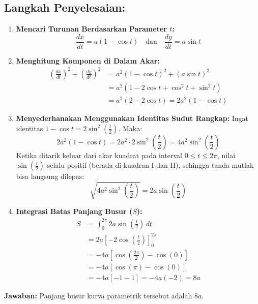 \documentclass[11pt,a4paper]{article}
\begin{document}
\subsection*{Langkah Penyelesaian:}
\begin{enumerate}
  \item \textbf{Mencari Turunan Berdasarkan Parameter $t$:}
  \begin{equation*}
    \frac{dx}{dt} = a(1 - \cos t) \quad \text{dan} \quad \frac{dy}{dt} = a\sin t
  \end{equation*}
  
  \item \textbf{Menghitung Komponen di Dalam Akar:}
  \begin{align*}
    \left(\frac{dx}{dt}\right)^2 + \left(\frac{dy}{dt}\right)^2 &= a^2(1 - \cos t)^2 + (a\sin t)^2 \\
    &= a^2(1 - 2\cos t + \cos^2 t + \sin^2 t) \\
    &= a^2(2 - 2\cos t) = 2a^2(1 - \cos t)
  \end{align*}
  
  \item \textbf{Menyederhanakan Menggunakan Identitas Sudut Rangkap:}
  Ingat identitas $1 - \cos t = 2\sin^2\left(\frac{t}{2}\right)$. Maka:
  \begin{equation*}
    2a^2(1 - \cos t) = 2a^2 \cdot 2\sin^2\left(\frac{t}{2}\right) = 4a^2\sin^2\left(\frac{t}{2}\right)
  \end{equation*}
  Ketika ditarik keluar dari akar kuadrat pada interval $0 \leq t \leq 2\pi$, nilai $\sin\left(\frac{t}{2}\right)$ selalu positif (berada di kuadran I dan II), sehingga tanda mutlak bisa langsung dilepas:
  \begin{equation*}
    \sqrt{4a^2\sin^2\left(\frac{t}{2}\right)} = 2a\sin\left(\frac{t}{2}\right)
  \end{equation*}
  
  \item \textbf{Integrasi Batas Panjang Busur ($S$):}
  \begin{align*}
    S &= \int_{0}^{2\pi} 2a\sin\left(\frac{t}{2}\right) \, dt \\
    &= 2a \left[ -2\cos\left(\frac{t}{2}\right) \right]_{0}^{2\pi} \\
    &= -4a \left[ \cos\left(\frac{2\pi}{2}\right) - \cos(0) \right] \\
    &= -4a [ \cos(\pi) - \cos(0) ] \\
    &= -4a [ -1 - 1 ] = -4a(-2) = 8a
  \end{align*}
\end{enumerate}
\textbf{Jawaban:} Panjang busur kurva parametrik tersebut adalah \textbf{$8a$}.
\end{document}
